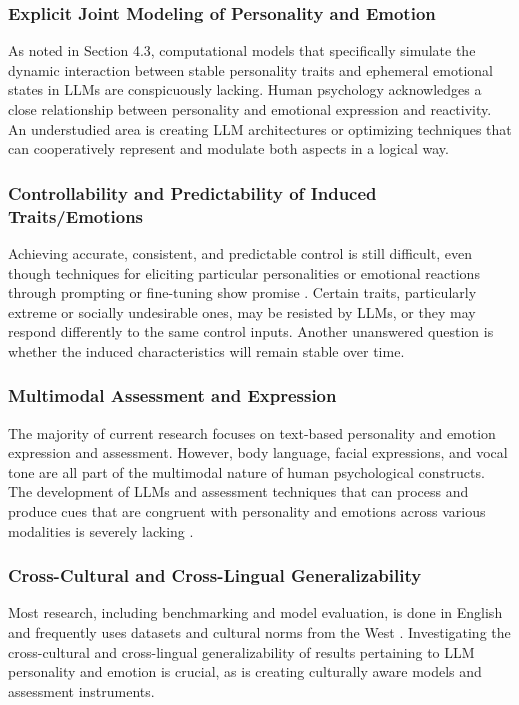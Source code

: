 \documentclass{DESSThesis}
\begin{document}
\subsubsection{Explicit Joint Modeling of Personality and Emotion}
As noted in Section 4.3, computational models that specifically simulate the dynamic interaction between stable personality traits and ephemeral emotional states in LLMs are conspicuously lacking. Human psychology acknowledges a close relationship between personality and emotional expression and reactivity. An understudied area is creating LLM architectures or optimizing techniques that can cooperatively represent and modulate both aspects in a logical way.

\subsubsection{Controllability and Predictability of Induced Traits/Emotions}
Achieving accurate, consistent, and predictable control is still difficult, even though techniques for eliciting particular personalities or emotional reactions through prompting or fine-tuning show promise \cite{mao_editing_2024,mozikov_good_2024,lee_llms_2024}. Certain traits, particularly extreme or socially undesirable ones, may be resisted by LLMs, or they may respond differently to the same control inputs. Another unanswered question is whether the induced characteristics will remain stable over time.

\subsubsection{Multimodal Assessment and Expression}
The majority of current research focuses on text-based personality and emotion expression and assessment. However, body language, facial expressions, and vocal tone are all part of the multimodal nature of human psychological constructs. The development of LLMs and assessment techniques that can process and produce cues that are congruent with personality and emotions across various modalities is severely lacking \cite{sabour_emobench_2024,wang_emotional_2023}.

\subsubsection{Cross-Cultural and Cross-Lingual Generalizability}
Most research, including benchmarking and model evaluation, is done in English and frequently uses datasets and cultural norms from the West \cite{lee_llms_2024,liu_emollms_2024,safdari_personality_2023}. Investigating the cross-cultural and cross-lingual generalizability of results pertaining to LLM personality and emotion is crucial, as is creating culturally aware models and assessment instruments.
\end{document}
